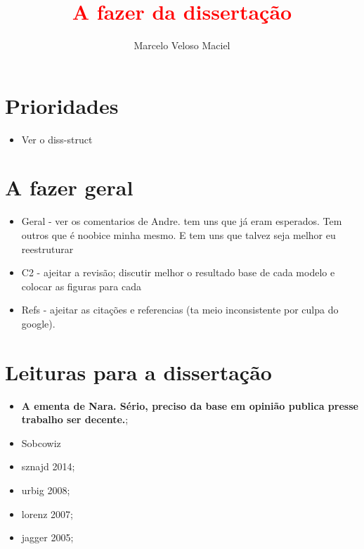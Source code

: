 \documentclass{article}
\title{\textcolor{red}{A fazer da dissertação}}
\author{Marcelo Veloso Maciel}
\date{}
\begin{document}
\pagecolor{base03}
\color{base1}

\maketitle

\section*{Prioridades}

\begin{itemize}
\item {\Large Ver o diss-struct}
\end{itemize}

\section*{A fazer geral}

\begin{itemize}

\item {\Large Geral - ver os comentarios de Andre. tem uns que já eram
    esperados. Tem outros que é noobice minha mesmo. E tem uns que talvez seja
    melhor eu reestruturar}
\item {\Large C2 - ajeitar a revisão; discutir melhor o resultado base de cada
    modelo e colocar as figuras para cada}
\item {\Large Refs - ajeitar as citações e referencias (ta meio inconsistente
    por culpa do google)}.

\end{itemize}

\section*{Leituras para a dissertação}

\begin{itemize}
\item {\Large \textbf{A ementa de Nara. Sério, preciso da base em opinião
      publica presse trabalho ser decente.};}
\item Sobcowiz
\item sznajd 2014;
\item urbig 2008; 
\item lorenz 2007;
\item jagger 2005;
\end{itemize}
\end{document}
